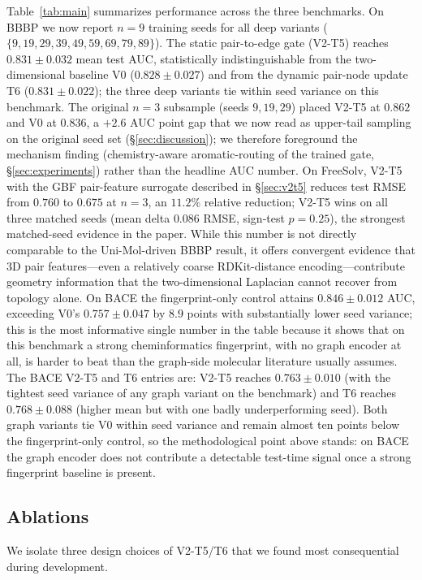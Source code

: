 \documentclass[conference]{IEEEtran}
\begin{document}
Table~\ref{tab:main} summarizes performance across the three benchmarks. On BBBP we now report $n{=}9$ training seeds for all deep variants ($\{9, 19, 29, 39, 49, 59, 69, 79, 89\}$). The static pair-to-edge gate (V2-T5) reaches $0.831 \pm 0.032$ mean test AUC, statistically indistinguishable from the two-dimensional baseline V0 ($0.828 \pm 0.027$) and from the dynamic pair-node update T6 ($0.831 \pm 0.022$); the three deep variants tie within seed variance on this benchmark. The original $n{=}3$ subsample (seeds $9, 19, 29$) placed V2-T5 at $0.862$ and V0 at $0.836$, a $+2.6$ AUC point gap that we now read as upper-tail sampling on the original seed set (\S\ref{sec:discussion}); we therefore foreground the mechanism finding (chemistry-aware aromatic-routing of the trained gate, \S\ref{sec:experiments}) rather than the headline AUC number. On FreeSolv, V2-T5 with the GBF pair-feature surrogate described in \S\ref{sec:v2t5} reduces test RMSE from $0.760$ to $0.675$ at $n{=}3$, an $11{.}2\%$ relative reduction; V2-T5 wins on all three matched seeds (mean delta $0.086$ RMSE, sign-test $p{=}0.25$), the strongest matched-seed evidence in the paper. While this number is not directly comparable to the Uni-Mol-driven BBBP result, it offers convergent evidence that 3D pair features---even a relatively coarse RDKit-distance encoding---contribute geometry information that the two-dimensional Laplacian cannot recover from topology alone. On BACE the fingerprint-only control attains $0.846 \pm 0.012$ AUC, exceeding V0's $0.757 \pm 0.047$ by $8.9$ points with substantially lower seed variance; this is the most informative single number in the table because it shows that on this benchmark a strong cheminformatics fingerprint, with no graph encoder at all, is harder to beat than the graph-side molecular literature usually assumes. The BACE V2-T5 and T6 entries are: V2-T5 reaches $0.763 \pm 0.010$ (with the tightest seed variance of any graph variant on the benchmark) and T6 reaches $0.768 \pm 0.088$ (higher mean but with one badly underperforming seed). Both graph variants tie V0 within seed variance and remain almost ten points below the fingerprint-only control, so the methodological point above stands: on BACE the graph encoder does not contribute a detectable test-time signal once a strong fingerprint baseline is present.

\subsection{Ablations}
\label{sec:ablations}
We isolate three design choices of V2-T5/T6 that we found most consequential during development.
\end{document}

